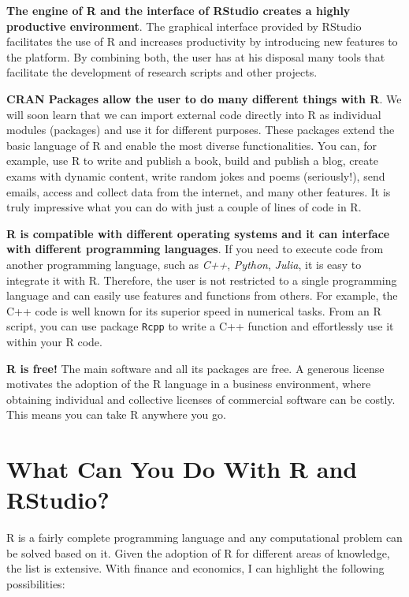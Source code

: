 \documentclass[
  12pt,
]{book}
\begin{document}
\textbf{The engine of R and the interface of RStudio creates a highly productive environment}. The graphical interface provided by RStudio facilitates the use of R and increases productivity by introducing new features to the platform. By combining both, the user has at his disposal many tools that facilitate the development of research scripts and other projects. 

\textbf{CRAN Packages allow the user to do many different things with R}. We will soon learn that we can import external code directly into R as individual modules (packages) and use it for different purposes. These packages extend the basic language of R and enable the most diverse functionalities. You can, for example, use R to write and publish a book, build and publish a blog, create exams with dynamic content, write random jokes and poems (seriously!), send emails, access and collect data from the internet, and many other features. It is truly impressive what you can do with just a couple of lines of code in R.

\textbf{R is compatible with different operating systems and it can interface with different programming languages}. If you need to execute code from another programming language, such as \emph{C++}, \emph{Python}, \emph{Julia}, it is easy to integrate it with R. Therefore, the user is not restricted to a single programming language and can easily use features and functions from others. For example, the C++ code is well known for its superior speed in numerical tasks. From an R script, you can use package \texttt{Rcpp} \citep{R-Rcpp} to write a C++ function and effortlessly use it within your R code.   

\textbf{R is free!} The main software and all its packages are free. A generous license motivates the adoption of the R language in a business environment, where obtaining individual and collective licenses of commercial software can be costly. This means you can take R anywhere you go.

\hypertarget{what-can-you-do-with-r-and-rstudio}{%
\section{What Can You Do With R and RStudio?}\label{what-can-you-do-with-r-and-rstudio}}

R is a fairly complete programming language and any computational problem can be solved based on it. Given the adoption of R for different areas of knowledge, the list is extensive. With finance and economics, I can highlight the following possibilities:
\end{document}

